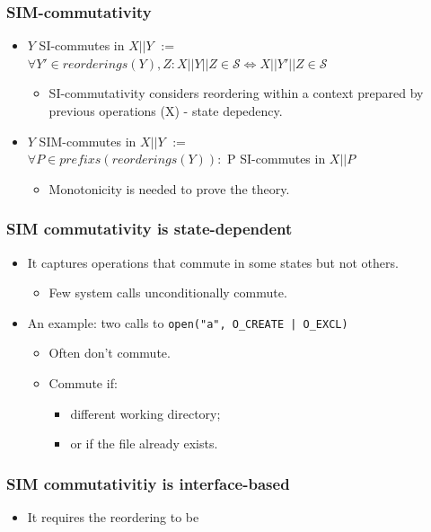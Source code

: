 \documentclass{beamer}
\begin{document}
\begin{frame}
\frametitle{SIM-commutativity}

\begin{itemize}
\item $Y$ SI-commutes in $X||Y$ $:=$ \\
  $\forall Y' \in reorderings(Y), Z: X||Y||Z \in \mathscr{S} 
  \Longleftrightarrow X||Y'||Z \in \mathscr{S} $

\begin{itemize}
\item SI-commutativity considers reordering within a context prepared by 
previous operations (X) - state depedency.
\end{itemize}

\item $Y$ SIM-commutes in $X||Y$ $:=$ \\
  $\forall P \in prefixs(reorderings(Y)):$ P SI-commutes in $X||P$
\begin{itemize}
\item Monotonicity is needed to prove the theory.
\end{itemize}
\end{itemize}

\end{frame}

\begin{frame}
\frametitle{SIM commutativity is state-dependent}

\begin{itemize}
\item It captures operations that commute in some states but not others.
\begin{itemize}
\item Few system calls unconditionally commute.
\end{itemize}

\item An example: two calls to \texttt{open("a", O\_CREATE | O\_EXCL)}
  \begin{itemize}
    \item Often don't commute.
    \item Commute if:
      \begin{itemize}
        \item different working directory;
        \item or if the file already exists. 
        \end{itemize}
\end{itemize}
\end{itemize}
\end{frame}


\begin{frame}
  \frametitle{SIM commutativitiy is interface-based}
  \begin{itemize}
    \item It requires the reordering to be 
  \end{itemize}
\end{frame}
\end{document}
